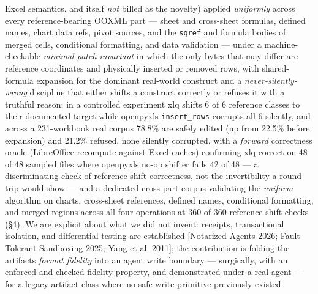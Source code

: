 \documentclass[
]{article}
\newcounter{none} %
\begin{document}
Excel semantics, and itself \emph{not} billed as the novelty) applied
\emph{uniformly} across every reference-bearing OOXML part --- sheet and
cross-sheet formulas, defined names, chart data refs, pivot sources, and
the \texttt{sqref} and formula bodies of merged cells, conditional
formatting, and data validation --- under a machine-checkable
\emph{minimal-patch invariant} in which the only bytes that may differ
are reference coordinates and physically inserted or removed rows, with
shared-formula expansion for the dominant real-world construct and a
\emph{never-silently-wrong} discipline that either shifts a construct
correctly or refuses it with a truthful reason; in a controlled
experiment xlq shifts 6 of 6 reference classes to their documented
target while openpyxl\textquotesingle s \texttt{insert\_rows} corrupts
all 6 silently, and across a 231-workbook real corpus 78.8\% are safely
edited (up from 22.5\% before expansion) and 21.2\% refused, none
silently corrupted, with a \emph{forward} correctness oracle
(LibreOffice recompute against Excel caches) confirming xlq correct on
48 of 48 sampled files where openpyxl\textquotesingle s no-op shifter
fails 42 of 48 --- a discriminating check of reference-shift
correctness, not the invertibility a round-trip would show --- and a
dedicated cross-part corpus validating the \emph{uniform} algorithm on
charts, cross-sheet references, defined names, conditional formatting,
and merged regions across all four operations at 360 of 360
reference-shift checks (§4). We are explicit about what we did not
invent: receipts, transactional isolation, and differential testing are
established {[}Notarized Agents 2026; Fault-Tolerant Sandboxing 2025;
Yang et al. 2011{]}; the contribution is folding the
artifact\textquotesingle s \emph{format fidelity} into an agent write
boundary --- surgically, with an enforced-and-checked fidelity property,
and demonstrated under a real agent --- for a legacy artifact class
where no safe write primitive previously existed.
\end{document}
